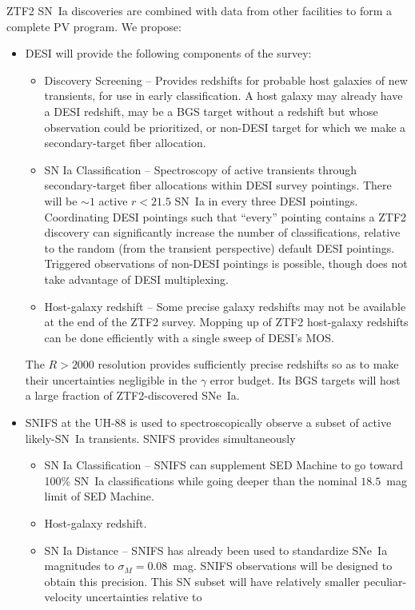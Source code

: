 ZTF2 SN~Ia discoveries are combined with data from other facilities to form a complete PV program.  We propose:
\begin{itemize}
\item DESI will provide the following components of the survey:
\begin{itemize}
\item Discovery Screening -- Provides redshifts for probable host galaxies of new transients, for use in early classification.  A host galaxy may
already have a DESI redshift, may be a BGS target without a redshift but whose observation could be prioritized,  or non-DESI target for which we
make a secondary-target fiber allocation.
\item SN Ia Classification -- Spectroscopy of active transients  through secondary-target fiber allocations within
DESI survey pointings. There
will be $\sim 1$ active $r<21.5$ SN~Ia in every three DESI pointings.  Coordinating DESI pointings such that ``every'' pointing contains
a  ZTF2 discovery can significantly increase the number of classifications, relative to the random (from the transient perspective) default DESI pointings.
Triggered observations of non-DESI pointings is possible, though does not take advantage of DESI multiplexing.
\item Host-galaxy redshift -- Some precise galaxy redshifts may not be available at the end of the ZTF2 survey.  Mopping up of ZTF2 host-galaxy redshifts
can be done efficiently with a single sweep of DESI's MOS.
\end{itemize}
 The $R>2000$ resolution
provides sufficiently precise redshifts so as to make their uncertainties negligible in the $\gamma$ error budget.
Its BGS targets  will host a large fraction of ZTF2-discovered SNe~Ia.
\item SNIFS at the UH-88 is used to spectroscopically observe a subset of active likely-SN~Ia transients.  SNIFS provides simultaneously
\begin{itemize}
\item SN Ia Classification -- SNIFS can supplement SED Machine to go toward 100\% SN~Ia classifications
while going deeper than the nominal $18.5$~mag limit of SED Machine.
\item Host-galaxy redshift.
\item SN Ia Distance -- SNIFS has already been used to standardize SNe~Ia magnitudes to $\sigma_M=0.08$~mag.  SNIFS observations will be
designed to obtain this precision.  This SN subset  will have relatively smaller peculiar-velocity uncertainties relative to 

\end{itemize}
\end{itemize}

